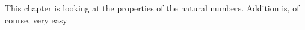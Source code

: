 \documentclass[a4]{scrartcl}
\begin{document}
This chapter is looking at the properties of the natural numbers.
Addition is, of course, very easy









\end{document}
